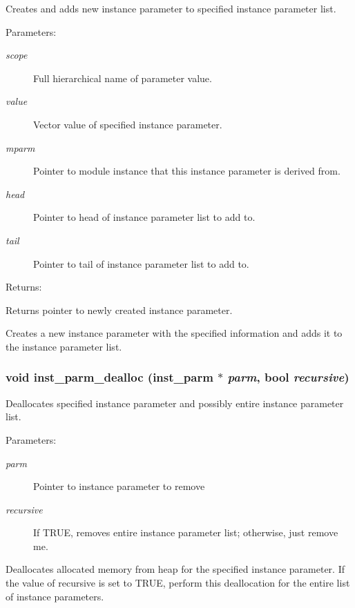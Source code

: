 Creates and adds new instance parameter to specified instance parameter list.

\begin{Desc}
\item[Parameters: ]\par
\begin{description}
\item[{\em 
scope}]Full hierarchical name of parameter value. \item[{\em 
value}]Vector value of specified instance parameter. \item[{\em 
mparm}]Pointer to module instance that this instance parameter is derived from. \item[{\em 
head}]Pointer to head of instance parameter list to add to. \item[{\em 
tail}]Pointer to tail of instance parameter list to add to.\end{description}
\end{Desc}
\begin{Desc}
\item[Returns: ]\par
Returns pointer to newly created instance parameter.\end{Desc}
Creates a new instance parameter with the specified information and adds  it to the instance parameter list. 
\subsubsection{\setlength{\rightskip}{0pt plus 5cm}void inst\_\-parm\_\-dealloc ({\bf inst\_\-parm} $\ast$ {\em parm}, {\bf bool} {\em recursive})}\label{param_8h_a14}


Deallocates specified instance parameter and possibly entire instance parameter list.

\begin{Desc}
\item[Parameters: ]\par
\begin{description}
\item[{\em 
parm}]Pointer to instance parameter to remove \item[{\em 
recursive}]If TRUE, removes entire instance parameter list; otherwise, just remove me.\end{description}
\end{Desc}
Deallocates allocated memory from heap for the specified instance parameter. If the value of recursive is set to TRUE, perform this deallocation for the entire list of instance parameters. 
